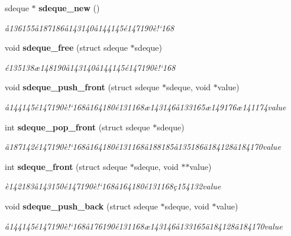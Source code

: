 \begin{CompactItemize}
\item 
sdeque $\ast$ {\bf sdeque\_\-new} ()
\begin{CompactList}\small\item\em \aa{}136155\aa{}187186\aa{}143140\aa{}144145\'{e}147190\`{e}!`168 \item\end{CompactList}\item 
void {\bf sdeque\_\-free} (struct sdeque $\ast$sdeque)
\begin{CompactList}\small\item\em \'{e}135138\ae{}148190\aa{}143140\aa{}144145\'{e}147190\`{e}!`168 \item\end{CompactList}\item 
void {\bf sdeque\_\-push\_\-front} (struct sdeque $\ast$sdeque, void $\ast$value)
\begin{CompactList}\small\item\em \aa{}144145\'{e}147190\`{e}!`168\aa{}164180\'{e}131168\ae{}143146\aa{}133165\ae{}149176\ae{}141174value \item\end{CompactList}\item 
int {\bf sdeque\_\-pop\_\-front} (struct sdeque $\ast$sdeque)
\begin{CompactList}\small\item\em \"{a}187142\'{e}147190\`{e}!`168\aa{}164180\'{e}131168\aa{}188185\aa{}135186\"{a}184128\"{a}184170value \item\end{CompactList}\item 
int {\bf sdeque\_\-front} (struct sdeque $\ast$sdeque, void $\ast$$\ast$value)
\begin{CompactList}\small\item\em \`{e}142183\aa{}143150\'{e}147190\`{e}!`168\aa{}164180\'{e}131168\c{c}154132value \item\end{CompactList}\item 
void {\bf sdeque\_\-push\_\-back} (struct sdeque $\ast$sdeque, void $\ast$value)
\begin{CompactList}\small\item\em \aa{}144145\'{e}147190\`{e}!`168\aa{}176190\'{e}131168\ae{}143146\aa{}133165\"{a}184128\"{a}184170value \item\end{CompactList}\item 
$$
\end{CompactItemize}
